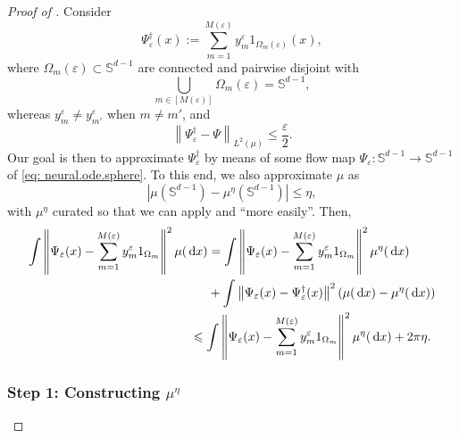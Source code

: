 \documentclass[a4paper,11pt]{article}
\theoremstyle{plain}
\newcommand{\diff}{\, \mathrm{d}}
\renewcommand{\S}{\mathbb{S}^{d-1}}
\renewcommand{\leq}{\leqslant}
\numberwithin{equation}{section}
\begin{document}
\begin{proof}[Proof of ]
Consider
\begin{equation} \label{eq: simple.function}
    \Psi^\dagger_\varepsilon(x):=\sum_{m=1}^{M(\varepsilon)} y_m^\varepsilon 1_{\Omega_m(\varepsilon)}(x),
\end{equation}
where $\Omega_m(\varepsilon)\subset\S$ are connected and pairwise disjoint with 
\begin{equation}\label{eq: partition}
    \bigcup_{m\in[M(\varepsilon)]} \Omega_m(\varepsilon) = \S,
\end{equation}
whereas $y_m^\varepsilon\neq y_{m'}^\varepsilon$ when $m\neq m'$, and
\begin{equation}\label{eq: approx.by.simple.function}
    \left\|\Psi^\dagger_\varepsilon-\Psi\right\|_{L^2(\mu)}\leq \frac{\varepsilon}{2}.
\end{equation}
Our goal is then to approximate $\Psi^\dagger_\varepsilon$ by means of some flow map $\Psi_\varepsilon:\S\to\S$ of \eqref{eq: neural.ode.sphere}. To this end, we also approximate $\mu$ as
\begin{equation*} %
   \left|\mu(\S)-\mu^\eta(\S)\right|\leq\eta,
\end{equation*}
with $\mu^\eta$ curated so that we can apply  and  ``more easily''. Then,
\begin{align}
    \int \left\|\Psi_\varepsilon(x)-\sum_{m=1}^{M(\varepsilon)}y_m^\varepsilon 1_{\Omega_m}\right\|^2\mu(\diff x)&=\int \left\|\Psi_\varepsilon(x)-\sum_{m=1}^{M(\varepsilon)}y_m^\varepsilon 1_{\Omega_m}\right\|^2\mu^\eta(\diff x)\nonumber\\
    &+\int\left\|\Psi_\varepsilon(x)-\Psi^\dagger_\varepsilon(x)\right\|^2(\mu(\diff x)-\mu^\eta(\diff x))\nonumber\\
    &\hspace{-0.5cm}\leq \int \left\|\Psi_\varepsilon(x)-\sum_{m=1}^{M(\varepsilon)}y_m^\varepsilon 1_{\Omega_m}\right\|^2\mu^\eta(\diff x)+2\pi\eta. 
    \label{eq: TV.implication}
\end{align}

\subsubsection*{Step 1: Constructing $\mu^\eta$}


\end{proof}
\end{document}
